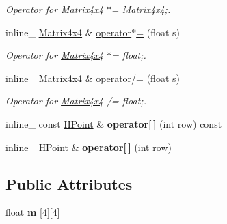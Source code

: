 \begin{DoxyCompactItemize}
\begin{DoxyCompactList}\small\item\em Operator for \hyperlink{classMatrix4x4}{Matrix4x4} $\ast$= \hyperlink{classMatrix4x4}{Matrix4x4};. \end{DoxyCompactList}\item 
inline\+\_\+ \hyperlink{classMatrix4x4}{Matrix4x4} \& \hyperlink{classMatrix4x4_a5b7cd0b32a1ed909719749a3e3835a3d}{operator$\ast$=} (float s)\hypertarget{classMatrix4x4_a5b7cd0b32a1ed909719749a3e3835a3d}{}\label{classMatrix4x4_a5b7cd0b32a1ed909719749a3e3835a3d}

\begin{DoxyCompactList}\small\item\em Operator for \hyperlink{classMatrix4x4}{Matrix4x4} $\ast$= float;. \end{DoxyCompactList}\item 
inline\+\_\+ \hyperlink{classMatrix4x4}{Matrix4x4} \& \hyperlink{classMatrix4x4_a54eb756b6824cd30e56a669d42774b02}{operator/=} (float s)\hypertarget{classMatrix4x4_a54eb756b6824cd30e56a669d42774b02}{}\label{classMatrix4x4_a54eb756b6824cd30e56a669d42774b02}

\begin{DoxyCompactList}\small\item\em Operator for \hyperlink{classMatrix4x4}{Matrix4x4} /= float;. \end{DoxyCompactList}\item 
inline\+\_\+ const \hyperlink{classHPoint}{H\+Point} \& {\bfseries operator\mbox{[}$\,$\mbox{]}} (int row) const \hypertarget{classMatrix4x4_a783156e0ef5e5eb7cf9a384feb60d7fb}{}\label{classMatrix4x4_a783156e0ef5e5eb7cf9a384feb60d7fb}

\item 
inline\+\_\+ \hyperlink{classHPoint}{H\+Point} \& {\bfseries operator\mbox{[}$\,$\mbox{]}} (int row)\hypertarget{classMatrix4x4_a9a26b36c4fb3d9a5e23acdef378db561}{}\label{classMatrix4x4_a9a26b36c4fb3d9a5e23acdef378db561}

\end{DoxyCompactItemize}
\subsection*{Public Attributes}
\begin{DoxyCompactItemize}
\item 
float {\bfseries m} \mbox{[}4\mbox{]}\mbox{[}4\mbox{]}\hypertarget{classMatrix4x4_a5ac0f2e2731307ac872f10cfcec868cd}{}\label{classMatrix4x4_a5ac0f2e2731307ac872f10cfcec868cd}

\end{DoxyCompactItemize}
